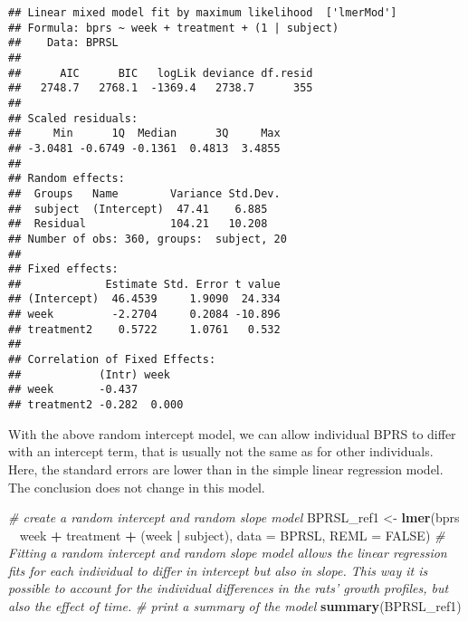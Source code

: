 \documentclass[]{article}
\newenvironment{Shaded}{\begin{snugshade}}{\end{snugshade}}
\newcommand{\CommentTok}[1]{\textcolor[rgb]{0.56,0.35,0.01}{\textit{#1}}}
\newcommand{\DataTypeTok}[1]{\textcolor[rgb]{0.13,0.29,0.53}{#1}}
\newcommand{\KeywordTok}[1]{\textcolor[rgb]{0.13,0.29,0.53}{\textbf{#1}}}
\newcommand{\NormalTok}[1]{#1}
\newcommand{\OperatorTok}[1]{\textcolor[rgb]{0.81,0.36,0.00}{\textbf{#1}}}
\newcommand{\OtherTok}[1]{\textcolor[rgb]{0.56,0.35,0.01}{#1}}
\newcommand{\StringTok}[1]{\textcolor[rgb]{0.31,0.60,0.02}{#1}}
\begin{document}
\begin{verbatim}
## Linear mixed model fit by maximum likelihood  ['lmerMod']
## Formula: bprs ~ week + treatment + (1 | subject)
##    Data: BPRSL
## 
##      AIC      BIC   logLik deviance df.resid 
##   2748.7   2768.1  -1369.4   2738.7      355 
## 
## Scaled residuals: 
##     Min      1Q  Median      3Q     Max 
## -3.0481 -0.6749 -0.1361  0.4813  3.4855 
## 
## Random effects:
##  Groups   Name        Variance Std.Dev.
##  subject  (Intercept)  47.41    6.885  
##  Residual             104.21   10.208  
## Number of obs: 360, groups:  subject, 20
## 
## Fixed effects:
##             Estimate Std. Error t value
## (Intercept)  46.4539     1.9090  24.334
## week         -2.2704     0.2084 -10.896
## treatment2    0.5722     1.0761   0.532
## 
## Correlation of Fixed Effects:
##            (Intr) week  
## week       -0.437       
## treatment2 -0.282  0.000
\end{verbatim}

With the above random intercept model, we can allow individual BPRS to
differ with an intercept term, that is usually not the same as for other
individuals. Here, the standard errors are lower than in the simple
linear regression model. The conclusion does not change in this model.

\begin{Shaded}
\begin{Highlighting}[]
\CommentTok{# create a random intercept and random slope model}
\NormalTok{BPRSL_ref1 <-}\StringTok{ }\KeywordTok{lmer}\NormalTok{(bprs }\OperatorTok{~}\StringTok{ }\NormalTok{week }\OperatorTok{+}\StringTok{ }\NormalTok{treatment }\OperatorTok{+}\StringTok{ }\NormalTok{(week }\OperatorTok{|}\StringTok{ }\NormalTok{subject), }\DataTypeTok{data =}\NormalTok{ BPRSL, }\DataTypeTok{REML =} \OtherTok{FALSE}\NormalTok{)}
\CommentTok{# Fitting a random intercept and random slope model allows the linear regression fits for each individual to differ in intercept but also in slope. This way it is possible to account for the individual differences in the rats' growth profiles, but also the   effect of time.}
\CommentTok{# print a summary of the model}
\KeywordTok{summary}\NormalTok{(BPRSL_ref1)}
\end{Highlighting}
\end{Shaded}
\end{document}
